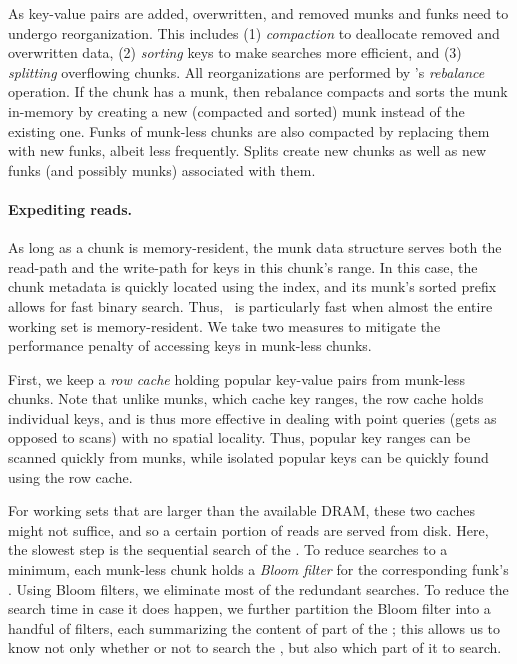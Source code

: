 As key-value pairs are added, overwritten, and removed munks and funks need to undergo reorganization. This includes  
(1) \emph{compaction} to deallocate removed and overwritten data, 
(2) \emph{sorting} keys to make searches more efficient,  and
(3) \emph{splitting} overflowing chunks.
All reorganizations are performed by \sys's \emph{rebalance} operation.
If the chunk has a munk, then rebalance compacts and sorts the munk in-memory by creating a new 
(compacted and sorted) munk instead of the existing one. 
Funks of munk-less chunks are also compacted by replacing them with new funks, albeit less frequently.
Splits  create new chunks as well as new  funks (and possibly munks) associated with them.

\paragraph{Expediting reads.}
As long as a chunk  is memory-resident, the munk data structure serves both the read-path and the write-path for keys in this chunk's range. 
In this case, the chunk metadata is quickly located using the index, and its munk's sorted prefix allows for fast binary search.
Thus, \sys\ is particularly fast when almost the entire working set is memory-resident. 
We take two measures to mitigate the performance penalty of accessing keys in munk-less chunks.

First, we keep a \emph{row cache} holding popular key-value pairs from munk-less chunks. Note that unlike munks, which cache key ranges, the row
cache holds individual keys, and is thus more effective in dealing with point queries (gets as opposed to scans) with no
spatial locality.
Thus, popular key ranges %
can be scanned quickly from munks, 
while  isolated popular keys %
can be quickly found using the row cache.

For working sets that are  larger than the available DRAM, these two caches might not suffice, and so a certain portion of reads are served from disk. Here, the slowest step is the sequential search of the . 
To reduce  searches to a minimum,
each munk-less chunk holds a \emph{Bloom filter} for the corresponding funk's .
Using Bloom filters, we eliminate most of the redundant   searches.
To reduce the  search time in case it does happen, 
we further  partition the Bloom filter into a  handful of filters, each summarizing the 
content of part of the ; this allows us to know not only whether or not to search the 
, but also which part of it to search.  
 


